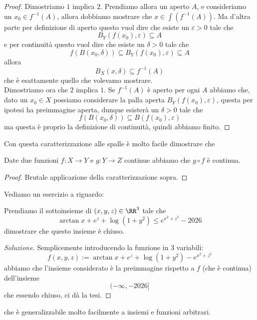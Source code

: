 \documentclass[11pt]{scrartcl}
\begin{document}
	\begin{proof}
		Dimostriamo $1$ implica $2$. Prendiamo allora un aperto $A$, e consideriamo un $x_0\in f^{-1}(A)$, allora dobbiamo mostrare che $x\in \int\left(f^{-1}(A)\right)$. Ma d'altra parte per definizione di aperto questo vuol dire che esiste un $\varepsilon>0$ tale che 
		$$B_Y(f(x_0),\varepsilon)\subseteq A$$ 
		e per continuità questo vuol dire che esiste un $\delta>0$ tale che
		$$f(B(x_0,\delta))\subseteq B_Y\left(f(x_0),\varepsilon\right)\subseteq A$$
		allora
		$$B_X(x,\delta)\subseteq f^{-1}(A)$$
		che è esattamente quello che volevamo mostrare. \\
		Dimostriamo ora che $2$ implica $1$. Se $f^{-1}(A)$ è aperto per ogni $A$ abbiamo che, dato un $x_0\in X$ possiamo considerare la palla aperta $B_Y(f(x_0),\varepsilon)$, questa per ipotesi ha preimmagine aperta, dunque esisterà un $\delta>0$ tale che
		$$f\left(B(x_0,\delta)\right)\subseteq B\left(f(x_0),\varepsilon\right)$$
		ma questa è proprio la definizione di continuità, quindi abbiamo finito.
	\end{proof}
	Con questa caratterizzazione alle spalle è molto facile dimostrare che
	\begin{corollary}
		Date due funzioni $f:X\to Y$ e $g:Y\to Z$ continue abbiamo che $g\circ f$ è continua. 
	\end{corollary}
	\begin{proof}
		Brutale applicazione della caratterizzazione sopra.
	\end{proof}
	Vediamo un esercizio a riguardo:
	\begin{problem}
		Prendiamo il sottoinsieme di $(x,y,z)\in\RR^3$ tale che
		$$\arctan x + e^z + \log(1+y^2)\le e^{x^2+z^2}-2026$$
		dimostrare che questo insieme è chiuso.
	\end{problem}
	\begin{proof}[Soluzione]
		Semplicemente introducendo la funzione in $3$ variabili:
		$$f(x,y,z):=\arctan x + e^z + \log(1+y^2)-e^{x^2+z^2}$$
		abbiamo che l'insieme considerato è la preimmagine rispetto a $f$ (che è continua) dell'insieme 
		$$(-\infty,-2026]$$
		che essendo chiuso, ci dà la tesi.
	\end{proof}
	che è generalizzabile molto facilmente a insiemi e funzioni arbitrari.
	
\end{document}

